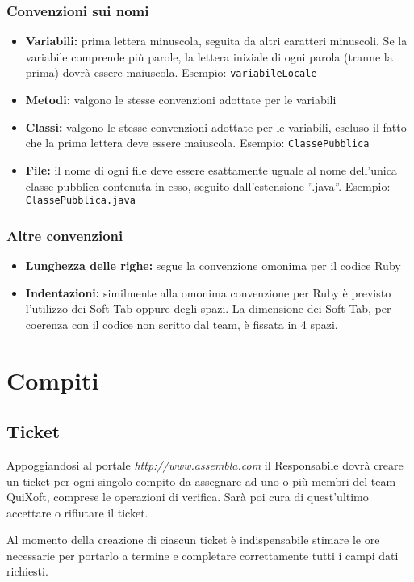 \documentclass[11pt,a4paper]{article}
\begin{document}
\subsubsection{Convenzioni sui nomi}
\begin{itemize}
\item\textbf{Variabili:}
prima lettera minuscola, seguita da altri caratteri minuscoli. Se la variabile comprende più parole, la lettera iniziale di ogni parola (tranne la prima) dovrà essere maiuscola. Esempio: \texttt{variabileLocale}
\item\textbf{Metodi:}
valgono le stesse convenzioni adottate per le variabili
\item\textbf{Classi:}
valgono le stesse convenzioni adottate per le variabili, escluso il fatto che la prima lettera deve essere maiuscola. Esempio: \texttt{ClassePubblica}
\item\textbf{File:}
il nome di ogni file deve essere esattamente uguale al nome dell'unica classe pubblica contenuta in esso, seguito dall'estensione ''.java''. Esempio: \texttt{ClassePubblica.java}
\end{itemize}
\subsubsection{Altre convenzioni}
\begin{itemize}
\item\textbf{Lunghezza delle righe:} segue la convenzione omonima per il codice Ruby
\item\textbf{Indentazioni:} similmente alla omonima convenzione per Ruby è previsto l'utilizzo dei Soft Tab oppure degli spazi. La dimensione dei Soft Tab, per coerenza con il codice non scritto dal team, è fissata in 4 spazi.
\end{itemize}

\section{Compiti}
\subsection{Ticket}
Appoggiandosi al portale \textit{http://www.assembla.com} il Responsabile dovrà creare un \underline{ticket} per ogni singolo compito da assegnare ad uno o più membri del team QuiXoft, comprese le operazioni di verifica.
Sarà poi cura di quest'ultimo accettare o rifiutare il ticket.

Al momento della creazione di ciascun ticket è indispensabile stimare le ore necessarie per portarlo a termine e completare correttamente tutti i campi dati richiesti.
\end{document}
